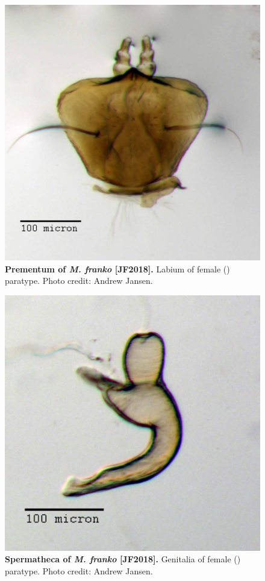 \documentclass[fleqn,10pt,lineno]{wlpeerj} %
\begin{document}
\begin{figure}[h]
	\centering
	\includegraphics[width=\textwidth]{figure19.jpg}
	\caption{\textbf{Prementum of \textit{M. franko} [JF2018].} Labium of female (\female) paratype. Photo credit: Andrew Jansen.}
	\label{fig:franko_prementum}
\end{figure}

\begin{figure}[h]
	\centering
	\includegraphics[width=\textwidth]{figure20.jpg}
	\caption{\textbf{Spermatheca of \textit{M. franko} [JF2018].} Genitalia of female (\female) paratype. Photo credit: Andrew Jansen.}
	\label{fig:franko_spermatheca}
\end{figure}
\end{document}
